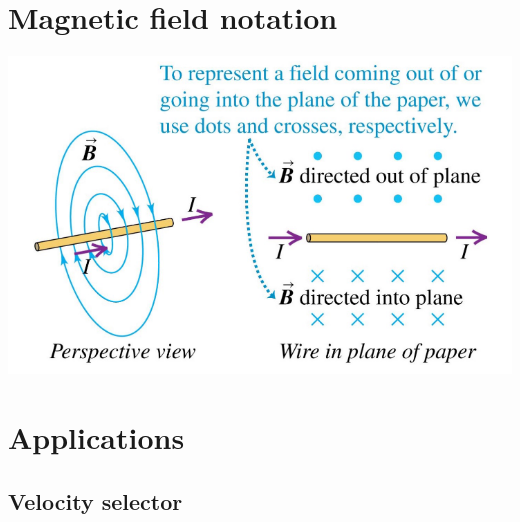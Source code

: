 \documentclass[11pt]{article}
\begin{document}
\section{Magnetic field notation}
\label{sec:orga765012}
\begin{center}
\includegraphics[width=.9\linewidth]{./images/magnetic-field-notation.png}
\end{center}
\section{Applications}
\label{sec:orgd78b9eb}

\subsection{Velocity selector}
\label{sec:orgae25827}
\end{document}
